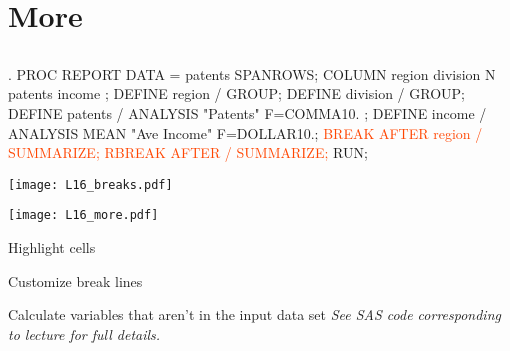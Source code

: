 \section[More]{More}
\subsection{}
\begin{frame}
\end{frame}


\begin{frame}[fragile]
\begin{code}{.}
PROC REPORT DATA = patents SPANROWS;
   COLUMN region division N patents income ;
   DEFINE region / GROUP;
   DEFINE division / GROUP;
   DEFINE patents / ANALYSIS "Patents" F=COMMA10. ;
   DEFINE income / ANALYSIS MEAN "Ave Income" F=DOLLAR10.;
   \textcolor{OrangeRed}{BREAK AFTER region / SUMMARIZE;}
   \textcolor{OrangeRed}{RBREAK AFTER / SUMMARIZE;}
RUN;
\end{code}
\emp
\vspace{5pt}
\texttt{[image: L16\_breaks.pdf]}\\
\end{frame}


\begin{frame}[fragile]
\texttt{[image: L16\_more.pdf]}
\emp
\blankcolumn
{}
\bi
\item Highlight cells
\item Customize break lines
\item Calculate variables that aren't in the input data set
\ei
\emph{See SAS code corresponding to lecture for full details.}
\emp
\end{frame}

